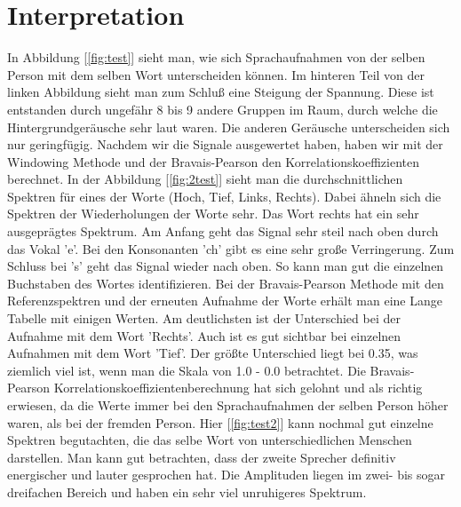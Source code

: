 \documentclass[12pt, oneside, a4paper, \docLanguage]{report}
\begin{document}
\section{Interpretation}
\label{chap:VERSUCH_2_INTERPRETATION}
In Abbildung [\ref{fig:test}] sieht man, wie sich Sprachaufnahmen von der selben Person mit dem selben Wort unterscheiden können.
Im hinteren Teil von der linken Abbildung sieht man zum Schluß eine Steigung der Spannung. 
\newline
Diese ist entstanden durch ungefähr 8 bis 9 andere Gruppen im Raum, durch welche die Hintergrundgeräusche sehr laut waren.
Die anderen Geräusche unterscheiden sich nur geringfügig.
\newline
\newline
Nachdem wir die Signale ausgewertet haben, haben wir mit der Windowing Methode und der Bravais-Pearson den Korrelationskoeffizienten berechnet.
In der Abbildung [\ref{fig:2test}] sieht man die durchschnittlichen Spektren für eines der Worte (Hoch, Tief, Links, Rechts).
\newline
Dabei ähneln sich die Spektren der Wiederholungen der Worte sehr. Das Wort rechts hat ein sehr ausgeprägtes Spektrum. 
\newline
Am Anfang geht das Signal sehr steil nach oben durch das Vokal 'e'.
Bei den Konsonanten 'ch' gibt es eine sehr große Verringerung. Zum Schluss bei 's' geht das Signal wieder nach oben.
So kann man gut die einzelnen Buchstaben des Wortes identifizieren.
\newline
\newline
Bei der Bravais-Pearson Methode mit den Referenzspektren und der erneuten Aufnahme der Worte erhält man eine Lange Tabelle mit einigen Werten.
Am deutlichsten ist der Unterschied bei der Aufnahme mit dem Wort 'Rechts'.
\newline
Auch ist es gut sichtbar bei einzelnen Aufnahmen mit dem Wort 'Tief'.
Der größte Unterschied liegt bei 0.35, was ziemlich viel ist, wenn man die Skala von 1.0 - 0.0 betrachtet.
\newline
Die Bravais-Pearson Korrelationskoeffizientenberechnung hat sich gelohnt und als richtig erwiesen, da die Werte immer bei den Sprachaufnahmen der selben Person höher waren, als bei der fremden Person.
\newline
\newline
Hier [\ref{fig:test2}] kann nochmal gut einzelne Spektren begutachten, die das selbe Wort von unterschiedlichen Menschen darstellen.
Man kann gut betrachten, dass der zweite Sprecher definitiv energischer und lauter gesprochen hat.
\newline
Die Amplituden liegen im zwei- bis sogar dreifachen Bereich und haben ein sehr viel unruhigeres Spektrum.
\end{document}
